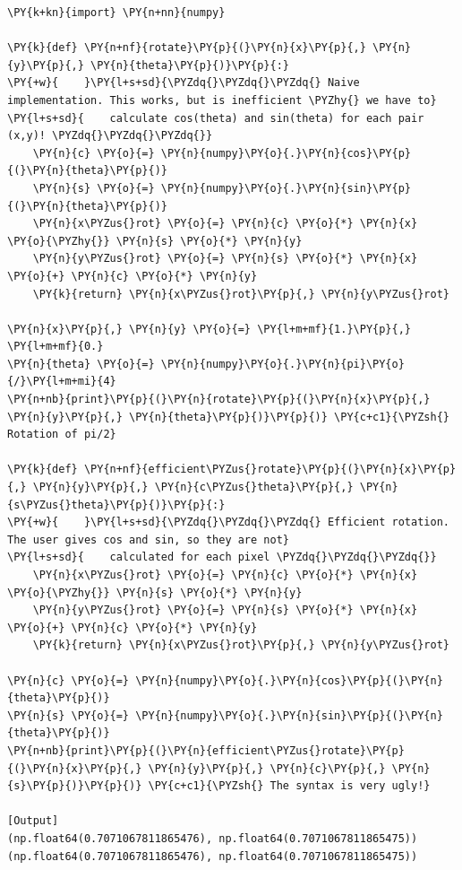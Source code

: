 \begin{Verbatim}[label=\makebox{\url{https://github.com/lucabaldini/cmepda/tree/master/slides/latex/snippets/rotation\_naive.py}},commandchars=\\\{\}]
\PY{k+kn}{import} \PY{n+nn}{numpy}

\PY{k}{def} \PY{n+nf}{rotate}\PY{p}{(}\PY{n}{x}\PY{p}{,} \PY{n}{y}\PY{p}{,} \PY{n}{theta}\PY{p}{)}\PY{p}{:}
\PY{+w}{    }\PY{l+s+sd}{\PYZdq{}\PYZdq{}\PYZdq{} Naive implementation. This works, but is inefficient \PYZhy{} we have to}
\PY{l+s+sd}{    calculate cos(theta) and sin(theta) for each pair (x,y)! \PYZdq{}\PYZdq{}\PYZdq{}}
    \PY{n}{c} \PY{o}{=} \PY{n}{numpy}\PY{o}{.}\PY{n}{cos}\PY{p}{(}\PY{n}{theta}\PY{p}{)}
    \PY{n}{s} \PY{o}{=} \PY{n}{numpy}\PY{o}{.}\PY{n}{sin}\PY{p}{(}\PY{n}{theta}\PY{p}{)}
    \PY{n}{x\PYZus{}rot} \PY{o}{=} \PY{n}{c} \PY{o}{*} \PY{n}{x} \PY{o}{\PYZhy{}} \PY{n}{s} \PY{o}{*} \PY{n}{y}
    \PY{n}{y\PYZus{}rot} \PY{o}{=} \PY{n}{s} \PY{o}{*} \PY{n}{x} \PY{o}{+} \PY{n}{c} \PY{o}{*} \PY{n}{y}
    \PY{k}{return} \PY{n}{x\PYZus{}rot}\PY{p}{,} \PY{n}{y\PYZus{}rot}

\PY{n}{x}\PY{p}{,} \PY{n}{y} \PY{o}{=} \PY{l+m+mf}{1.}\PY{p}{,} \PY{l+m+mf}{0.}
\PY{n}{theta} \PY{o}{=} \PY{n}{numpy}\PY{o}{.}\PY{n}{pi}\PY{o}{/}\PY{l+m+mi}{4}
\PY{n+nb}{print}\PY{p}{(}\PY{n}{rotate}\PY{p}{(}\PY{n}{x}\PY{p}{,} \PY{n}{y}\PY{p}{,} \PY{n}{theta}\PY{p}{)}\PY{p}{)} \PY{c+c1}{\PYZsh{} Rotation of pi/2}
    
\PY{k}{def} \PY{n+nf}{efficient\PYZus{}rotate}\PY{p}{(}\PY{n}{x}\PY{p}{,} \PY{n}{y}\PY{p}{,} \PY{n}{c\PYZus{}theta}\PY{p}{,} \PY{n}{s\PYZus{}theta}\PY{p}{)}\PY{p}{:}
\PY{+w}{    }\PY{l+s+sd}{\PYZdq{}\PYZdq{}\PYZdq{} Efficient rotation. The user gives cos and sin, so they are not}
\PY{l+s+sd}{    calculated for each pixel \PYZdq{}\PYZdq{}\PYZdq{}}
    \PY{n}{x\PYZus{}rot} \PY{o}{=} \PY{n}{c} \PY{o}{*} \PY{n}{x} \PY{o}{\PYZhy{}} \PY{n}{s} \PY{o}{*} \PY{n}{y}
    \PY{n}{y\PYZus{}rot} \PY{o}{=} \PY{n}{s} \PY{o}{*} \PY{n}{x} \PY{o}{+} \PY{n}{c} \PY{o}{*} \PY{n}{y}
    \PY{k}{return} \PY{n}{x\PYZus{}rot}\PY{p}{,} \PY{n}{y\PYZus{}rot}
    
\PY{n}{c} \PY{o}{=} \PY{n}{numpy}\PY{o}{.}\PY{n}{cos}\PY{p}{(}\PY{n}{theta}\PY{p}{)}
\PY{n}{s} \PY{o}{=} \PY{n}{numpy}\PY{o}{.}\PY{n}{sin}\PY{p}{(}\PY{n}{theta}\PY{p}{)}
\PY{n+nb}{print}\PY{p}{(}\PY{n}{efficient\PYZus{}rotate}\PY{p}{(}\PY{n}{x}\PY{p}{,} \PY{n}{y}\PY{p}{,} \PY{n}{c}\PY{p}{,} \PY{n}{s}\PY{p}{)}\PY{p}{)} \PY{c+c1}{\PYZsh{} The syntax is very ugly!}

[Output]
(np.float64(0.7071067811865476), np.float64(0.7071067811865475))
(np.float64(0.7071067811865476), np.float64(0.7071067811865475))
\end{Verbatim}